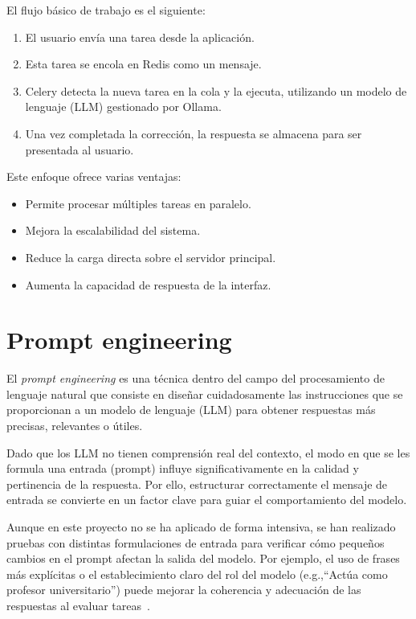 El flujo básico de trabajo es el siguiente:
\begin{enumerate}
    \item El usuario envía una tarea desde la aplicación.
    \item Esta tarea se encola en Redis como un mensaje.
    \item Celery detecta la nueva tarea en la cola y la ejecuta, utilizando un modelo de lenguaje (LLM) gestionado por Ollama.
    \item Una vez completada la corrección, la respuesta se almacena para ser presentada al usuario.
\end{enumerate}

Este enfoque ofrece varias ventajas:
\begin{itemize}
    \item Permite procesar múltiples tareas en paralelo.
    \item Mejora la escalabilidad del sistema.
    \item Reduce la carga directa sobre el servidor principal.
    \item Aumenta la capacidad de respuesta de la interfaz.
\end{itemize}

\section{Prompt engineering}

El \textit{prompt engineering} es una técnica dentro del campo del procesamiento de lenguaje natural
que consiste en diseñar cuidadosamente las instrucciones que se proporcionan a un modelo de 
lenguaje (LLM) para obtener respuestas más precisas, relevantes o útiles.

Dado que los LLM no tienen comprensión real del contexto, el modo en que se les formula una 
entrada (prompt) influye significativamente en la calidad y pertinencia de la respuesta. 
Por ello, estructurar correctamente el mensaje de entrada se convierte en un factor clave 
para guiar el comportamiento del modelo.

Aunque en este proyecto no se ha aplicado de forma intensiva, se han realizado pruebas con distintas 
formulaciones de entrada para verificar cómo pequeños cambios en el prompt afectan la salida del 
modelo. Por ejemplo, el uso de frases más explícitas o el establecimiento claro del rol del modelo 
(e.g.,``Actúa como profesor universitario'') puede mejorar la coherencia y adecuación de las 
respuestas al evaluar tareas~\cite{web:promptingguide}.

